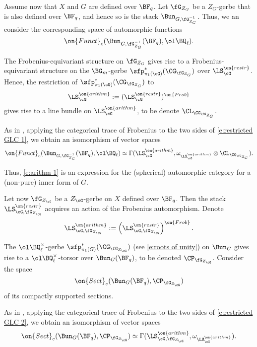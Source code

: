 \documentclass[9pt]{amsart}
\theoremstyle{remark}
\theoremstyle{definition}
\theoremstyle{remark}
\numberwithin{equation}{section}
\begin{document}
\sssec{}

Assume now that $X$ and $G$ are defined over $\BF_q$. Let $\fG_{Z_G}$ be a $Z_G$-gerbe that is also
defined over $\BF_q$, and hence so is the stack $\Bun_{G,\fG^{-1}_{Z_G}}$. Thus, we an consider the 
corresponding space of automorphic functions
$$\on{Funct}_c(\Bun_{G,\fG^{-1}_{Z_G}}(\BF_q),\ol\BQ_\ell).$$

\medskip

The Frobenius-equivariant structure on $\fG_{Z_G}$ gives rise to a Frobenius-equivariant structure
on the $\BG_m$-gerbe $\sfp_{\pi_1(\cG)}^*(\CG_{\fG_{Z_G}})$ over $\LS^{\on{restr}}_\cG$. 
Hence, the restriction of $\sfp_{\pi_1(\cG)}^*(\CG_{\fG_{Z_G}})$ to
$$\LS_\cG^{\on{arithm}}:=(\LS^{\on{restr}}_\cG)^{\on{Frob}}$$
gives rise to a line bundle on $\LS_\cG^{\on{arithm}}$, to be denote $\CL_{\CG_{\fG_{Z_G}}}$. 

\medskip

As in \cite[Conjecture 24.8.6]{AGKRRV}, applying the categorical trace of Frobenius to the two sides of \eqref{e:restricted GLC 1}, 
we obtain an isomorphism of vector spaces
\begin{equation} \label{e:arithm 1}
\on{Funct}_c(\Bun_{G,\fG^{-1}_{Z_G}}(\BF_q),\ol\BQ_\ell) \simeq
\Gamma(\LS_\cG^{\on{arithm}},\omega_{\LS_\cG^{\on{arithm}}}\otimes \CL_{\CG_{\fG_{Z_G}}}).
\end{equation} 

Thus, \eqref{e:arithm 1} is an expression for the (spherical) automorphic category 
for a (non-pure) inner form of $G$.

\sssec{}

Let now $\fG_{Z_\cG}$ be a $Z_\cG$-gerbe on $X$ defined over $\BF_q$. Then the stack 
$\LS^{\on{restr}}_{\cG,\fG_{Z_{\cG}}}$ acquires an action of the Frobenius automorphism.
Denote
$$\LS^{\on{arithm}}_{\cG,\fG_{Z_{\cG}}}:=\left(\LS^{\on{restr}}_{\cG,\fG_{Z_{\cG}}}\right)^{\on{Frob}}.$$

The $\ol\BQ_\ell^\times$-gerbe $\sfp^*_{\pi_1(G)}(\CG_{\fG_{Z_{\cG}}})$ (see \eqref{e:roots of unity}) on
$\Bun_G$ gives rise to a $\ol\BQ_\ell^\times$-torsor over $\Bun_G(\BF_q)$, to be denoted $\CP_{\fG_{Z_{\cG}}}$.
Consider the space
$$\on{Sect}_c(\Bun_G(\BF_q),\CP_{\fG_{Z_{\cG}}})$$
of its compactly supported sections.

\medskip

As in \cite[Conjecture 24.8.6]{AGKRRV}, applying the categorical trace of Frobenius to the two sides of \eqref{e:restricted GLC 2}, 
we obtain an isomorphism of vector spaces
\begin{equation} \label{e:arithm 2}
\on{Sect}_c(\Bun_G(\BF_q),\CP_{\fG_{Z_{\cG}}})\simeq 
\Gamma(\LS_{\cG,\fG_{Z_{\cG}}}^{\on{arithm}},\omega_{\LS_\cG^{\on{arithm}}}).
\end{equation} 
\end{document}
